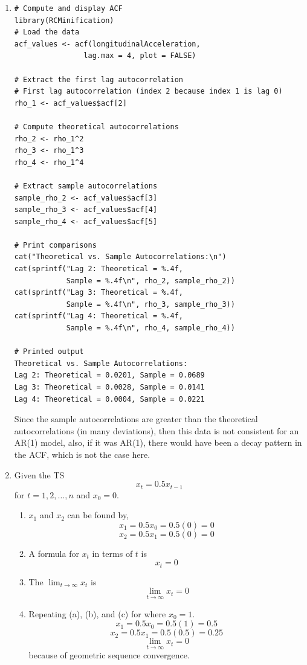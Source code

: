 \documentclass[12pt]{article}
\begin{document}
\begin{enumerate}
    \item 
    \begin{verbatim}
# Compute and display ACF
library(RCMinification)
# Load the data
acf_values <- acf(longitudinalAcceleration, 
                lag.max = 4, plot = FALSE)

# Extract the first lag autocorrelation
# First lag autocorrelation (index 2 because index 1 is lag 0)
rho_1 <- acf_values$acf[2]

# Compute theoretical autocorrelations
rho_2 <- rho_1^2
rho_3 <- rho_1^3
rho_4 <- rho_1^4

# Extract sample autocorrelations
sample_rho_2 <- acf_values$acf[3]
sample_rho_3 <- acf_values$acf[4]
sample_rho_4 <- acf_values$acf[5]

# Print comparisons
cat("Theoretical vs. Sample Autocorrelations:\n")
cat(sprintf("Lag 2: Theoretical = %.4f, 
            Sample = %.4f\n", rho_2, sample_rho_2))
cat(sprintf("Lag 3: Theoretical = %.4f, 
            Sample = %.4f\n", rho_3, sample_rho_3))
cat(sprintf("Lag 4: Theoretical = %.4f, 
            Sample = %.4f\n", rho_4, sample_rho_4))

# Printed output
Theoretical vs. Sample Autocorrelations:
Lag 2: Theoretical = 0.0201, Sample = 0.0689
Lag 3: Theoretical = 0.0028, Sample = 0.0141
Lag 4: Theoretical = 0.0004, Sample = 0.0221
    \end{verbatim}
    Since the sample autocorrelations are greater than the theoretical autocorrelations (in many deviations),
    then this data is not consistent for an AR(1) model, also, if it was AR(1), there would have been a decay
    pattern in the ACF, which is not the case here.
    
    \item Given the TS
    \[ x_t = 0.5x_{t-1} \]
    for $t = 1,2, \ldots, n$ and $x_0 = 0$.

    \begin{enumerate}
        \item $x_1$ and $x_2$ can be found by,
        \[ x_1 = 0.5x_0 = 0.5(0) = 0 \]
        \[ x_2 = 0.5x_1 = 0.5(0) = 0 \]
        \item A formula for $x_t$ in terms of $t$ is
        \[ x_t = 0 \]
        \item The $\lim_{t \to \infty} x_t$ is
        \[ \lim_{t \to \infty} x_t = 0 \]
        \item Repeating (a), (b), and (c) for where $x_0 = 1$.
        \[ x_1 = 0.5x_0 = 0.5(1) = 0.5 \]
        \[ x_2 = 0.5x_1 = 0.5(0.5) = 0.25 \]
        \[ \lim_{t \to \infty} x_t = 0 \]
        because of geometric sequence convergence.
    \end{enumerate}


\end{enumerate}
\end{document}
